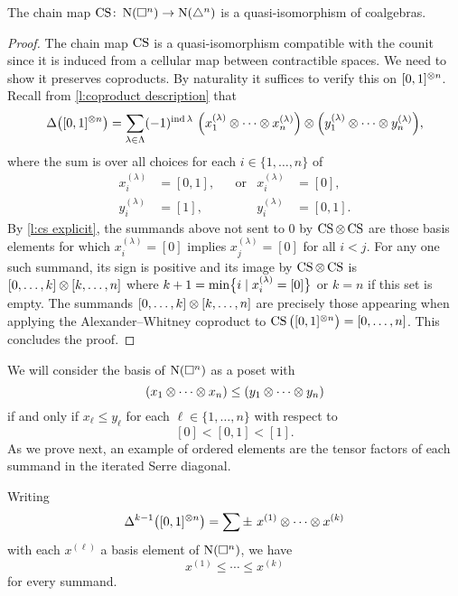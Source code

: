 \begin{lemma} \label{l:cs coalgebra map}
	The chain map $\CS \colon \chains(\cube^n) \to \chains(\simplex^n)$ is a quasi-isomorphism of coalgebras.
\end{lemma}

\begin{proof}
	The chain map $\CS$ is a quasi-isomorphism compatible with the counit since it is induced from a cellular map between contractible spaces.
	We need to show it preserves coproducts.
	By naturality it suffices to verify this on $[0,1]^{\ot n}$.
	Recall from \cref{l:coproduct description} that
	\[
	\Delta \big( [0,1]^{\ot n} \big) =
	\sum_{\lambda \in \Lambda} (-1)^{\ind \lambda} \
	\Big(x_1^{(\lambda)} \ot \cdots \ot x_n^{(\lambda)}\Big) \ot
	\Big(y_1^{(\lambda)} \ot \cdots \ot y_n^{(\lambda)}\Big),
	\]
	where the sum is over all choices for each $i \in \{1,\dots,n\}$ of
	\begin{align*}
		x_i^{(\lambda)} &= [0,1],&&\text{or} & x_i^{(\lambda)} &= [0], \\
		y_i^{(\lambda)} &= [1], && & y_i^{(\lambda)} &= [0,1].
	\end{align*}
	By \cref{l:cs explicit}, the summands above not sent to $0$ by $\CS \ot \CS$ are those basis elements for which $x_i^{(\lambda)} = [0]$ implies $x_j^{(\lambda)} = [0]$ for all $i < j$.
	For any one such summand, its sign is positive and its image by $\CS \ot \CS$ is $[0, \dots, k] \ot [k, \dots, n]$ where $k+1 = \min\set[\big]{i \mid x_i^{(\lambda)} = [0]}$ or $k = n$ if this set is empty.
	The summands $[0, \dots, k] \ot [k,\dots,n]$ are precisely those appearing when applying the Alexander--Whitney coproduct to $\CS \big([0,1]^{\ot n}\big) = [0,\dots,n]$.
	This concludes the proof.
\end{proof}

We will consider the basis of $\chains(\cube^n)$ as a poset with
\[
(x_1 \ot \cdots \ot x_n) \leq (y_1 \ot \cdots \ot y_n)
\]
if and only if $x_\ell \leq y_\ell$ for each $\ell \in \{1, \dots, n\}$ with respect to
\[
[0] < [0,1] < [1].
\]
As we prove next, an example of ordered elements are the tensor factors of each summand in the iterated Serre diagonal.

\begin{lemma} \label{l:order iterated coproduct}
	Writing
	\[
	\Delta^{k-1} \big([0,1]^{\ot n}\big) =
	\sum \pm \ x^{(1)} \ot \cdots \ot x^{(k)}
	\]
	with each $x^{(\ell)}$ a basis element of $\chains(\cube^n)$, we have
	\[
	x^{(1)} \leq \cdots \leq x^{(k)}
	\]
	for every summand.
\end{lemma}


